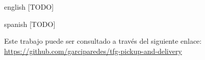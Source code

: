 \documentclass{subfiles}
\newenvironment{abstractpage}
  {\cleardoublepage\vspace*{\fill}\thispagestyle{empty}}
  {\vfill\cleardoublepage}
\newenvironment{abstract-lang}[1]
  {\bigskip\selectlanguage{#1}%
   \begin{center}\bfseries\abstractname\end{center}}
  {\par\bigskip}
\begin{document}
  \begin{abstractpage}
    \begin{abstract-lang}{english}
      [TODO]
    \end{abstract-lang}
    \begin{abstract-lang}{spanish}
      [TODO]
    \end{abstract-lang}

    \centering
    Este trabajo puede ser consultado a través del siguiente enlace: \url{https://github.com/garciparedes/tfg-pickup-and-delivery}

  \end{abstractpage}
\end{document}
